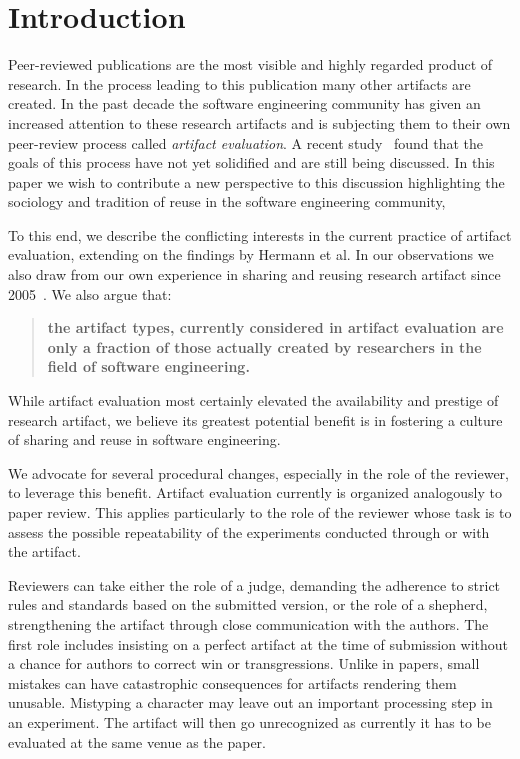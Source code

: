 \documentclass[smallextended]{svjour3}       %
\begin{document}
\section{Introduction}
\label{intro}

Peer-reviewed publications are the most visible and highly regarded product of research. 
In the process leading to this publication many other artifacts are created. 
In the past decade the software engineering community has given an increased attention to these research artifacts and is subjecting them to their own peer-review process called \emph{artifact evaluation}. 
A recent study~\cite{10.1145/3368089.3409767} found that the goals of this process have not yet solidified and are still being discussed. 
In this paper we wish to contribute a new perspective to this discussion highlighting the sociology and tradition of reuse in the software engineering community, 

To this end, we describe the conflicting interests in the current practice of artifact evaluation, extending on the findings by Hermann et al. 
In our observations we also draw from our own experience in sharing and reusing research artifact since 2005~\cite{menzies2013guest}. 
We also argue that:
\begin{quote}
{\bf
the artifact types, currently considered in artifact evaluation are only a fraction of those actually created by researchers in the field of software engineering\cite{chambers2019s}.}
\end{quote}

While artifact evaluation most certainly elevated the availability and prestige of research artifact, we believe its greatest potential benefit is in fostering a culture of sharing and reuse in software engineering.

We advocate for several procedural changes, especially in the role of the reviewer, to leverage this benefit.
Artifact evaluation currently is organized analogously to paper review.
This applies particularly to the role of the reviewer whose task is to assess the possible repeatability of the experiments conducted through or with the artifact.

Reviewers can take either the role of a judge, demanding the adherence to strict rules and standards based on the submitted version, or the role of a shepherd, strengthening the artifact through close communication with the authors. 
The first role includes insisting on a perfect artifact at the time of submission without a chance for authors to correct win or transgressions. 
Unlike in papers, small mistakes can have catastrophic consequences for artifacts rendering them unusable. 
Mistyping a character may leave out an important processing step in an experiment. 
The artifact will then go unrecognized as currently it has to be evaluated at the same venue as the paper.
 
\end{document}
